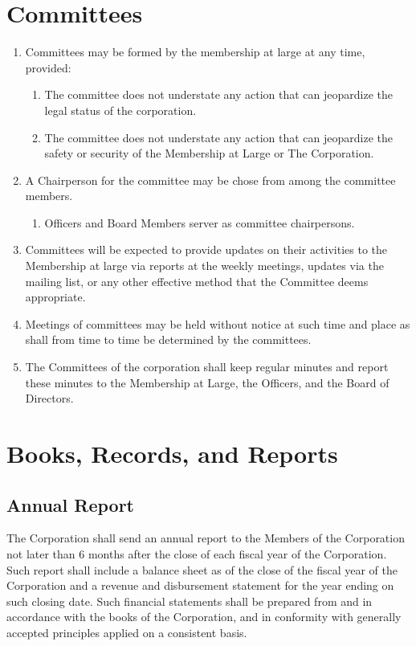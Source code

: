 \documentclass{article}
\begin{document}
\section{Committees}
\begin{enumerate}
\item Committees may be formed by the membership at large at any time, provided:
\begin{enumerate}
\item The committee does not understate any action that can jeopardize the legal status 
of the corporation.
\item The committee does not understate any action that can jeopardize the safety or 
security of the Membership at Large or The Corporation.
\end{enumerate}
\item A Chairperson for the committee may be chose from among the committee 
members.
\begin{enumerate}
\item Officers and Board Members server as committee chairpersons.
\end{enumerate}
\item Committees will be expected to provide updates on their activities to the 
Membership at large via reports at the weekly meetings, updates via the mailing list, or any 
other effective method that the Committee deems appropriate.
\item Meetings of committees may be held without notice at such time and place as shall 
from time to time be determined by the committees.
\item The Committees of the corporation shall keep regular minutes and report these 
minutes to the Membership at Large, the Officers, and the Board of Directors.
\end{enumerate}
\section{Books, Records, and Reports}
\subsection{Annual Report}
The Corporation shall send an annual report to the Members of the Corporation not later 
than 6 months after the close of each fiscal year of the Corporation. Such report shall 
include a balance sheet as of the close of the fiscal year of the Corporation and a revenue 
and disbursement statement for the year ending on such closing date.  Such financial 
statements shall be prepared from and in accordance with the books of the Corporation, 
and in conformity with generally accepted principles applied on a consistent basis.
\end{document}
